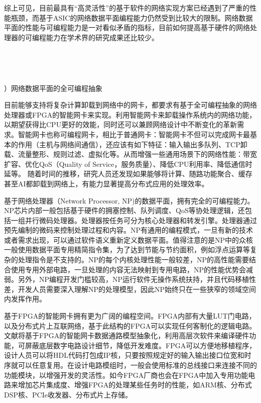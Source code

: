 综上可见，目前最具有“高灵活性”的基于软件的网络实现方案已经遇到了严重的性能瓶颈，而基于ASIC的网络数据平面编程能力仍然受到比较大的限制。网络数据平面的性能与可编程能力是一对看似矛盾的指标，目前如何提高基于硬件的网络处理器的可编程能力在学术界的研究成果还比较少。
 
  
   \ \ 
   
   \ \ 

\label{chap123}


{）网络数据平面的全可编程抽象}


目前能够支持将复杂计算卸载到网络中的网卡，都要求有基于全可编程抽象的网络处理器或FPGA的智能网卡来实现。利用智能网卡来卸载操作系统内的网络功能，以期望获得比CPU更好的效能，同时还可以兼顾网络设计中不断变化的革新需求。智能网卡也称可编程网卡，相比于普通网卡：智能网卡不但可以完成网卡最基本的作用（主机与网络间通信），还应该有如下特征：输入输出多队列、TCP卸载、流量整形、规则过滤、虚拟化等。从而增强一些通用场景下的网络性能：带宽扩容、优化QoS（Quality of Service，服务质量）、降低CPU利用率、降低通信时延等。
随着时间的推移，研究人员还发现如果能够将计算、随路功能聚合、缓存甚至AI都卸载到网络上，有能力显著提高分布式应用的处理效率。


基于网络处理器（Network Processor, NP)的数据平面，拥有完全的可编程能力。NP芯片内部一般包括基于硬件的拥塞控制、队列调度、QoS等协处理逻辑，还包括一组并行微码处理器。处理器按任务可分为核心处理器和转发引擎。处理器通过预先编制的微码来控制处理过程和内容。NP有通用的编程模式，一旦有新的技术或者需求出现，可以通过软件语义重新定义数据平面。值得注意的是NP中的众核一般使用数据平面专用精简指令集，为了达到节能与节约面积，例如浮点运算等复杂的处理指令是不支持的。NP的每个内核处理性能一般较差，NP的高性能需要结合使用专用外部电路，一旦处理的内容无法映射到专用电路，NP的性能优势会减弱。另外，NP编程开发门槛较高，NP运行软件无操作系统扶持，并且代码移植性差，开发人员需要深入理解NP的处理模型，因此NP始终只在一些狭窄的领域空间内发挥作用。



基于FPGA的智能网卡拥有更为广阔的编程空间。FPGA内部有大量LUT门电路，以及分布式片上互联网络，基于此结构的FPGA可以实现任何客制化的逻辑电路。文献\cite{wang2017p4fpga}将基于FPGA的智能网卡数据通路模型抽象化，利用高层次软件来编译硬件功能，可屏蔽底层数字电路设计细节，降低开发难度。FPGA可以方便地移植程序，设计人员可以将HDL代码打包成IP核，只要按照规定好的输入输出接口位宽和时序就可以任意复用。在设计电路模组时，一般会使用标准的总线接口来连接不同的功能模块，以增强开发的灵活性。如今FPGA厂商也会在FPGA中加入专用功能电路来增加芯片集成度、增强FPGA的处理某些任务时的性能，如ARM核、分布式DSP核、PCIe收发器、分布式片上存储。

